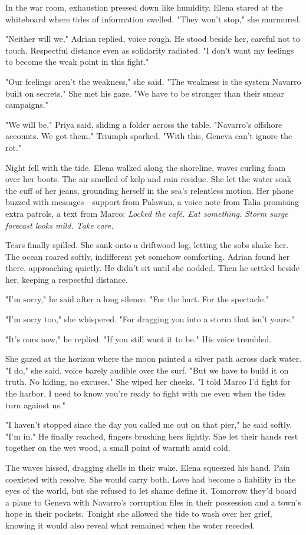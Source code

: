 In the war room, exhaustion pressed down like humidity. Elena stared at the whiteboard where tides of information swelled. "They won't stop," she murmured.

"Neither will we," Adrian replied, voice rough. He stood beside her, careful not to touch. Respectful distance even as solidarity radiated. "I don't want my feelings to become the weak point in this fight."

"Our feelings aren't the weakness," she said. "The weakness is the system Navarro built on secrets." She met his gaze. "We have to be stronger than their smear campaigns."

"We will be," Priya said, sliding a folder across the table. "Navarro's offshore accounts. We got them." Triumph sparked. "With this, Geneva can't ignore the rot."

Night fell with the tide. Elena walked along the shoreline, waves curling foam over her boots. The air smelled of kelp and rain residue. She let the water soak the cuff of her jeans, grounding herself in the sea's relentless motion. Her phone buzzed with messages—support from Palawan, a voice note from Talia promising extra patrols, a text from Marco: \textit{Locked the café. Eat something. Storm surge forecast looks mild. Take care.}

Tears finally spilled. She sank onto a driftwood log, letting the sobs shake her. The ocean roared softly, indifferent yet somehow comforting. Adrian found her there, approaching quietly. He didn't sit until she nodded. Then he settled beside her, keeping a respectful distance.

"I'm sorry," he said after a long silence. "For the hurt. For the spectacle."

"I'm sorry too," she whispered. "For dragging you into a storm that isn't yours."

"It's ours now," he replied. "If you still want it to be." His voice trembled.

She gazed at the horizon where the moon painted a silver path across dark water. "I do," she said, voice barely audible over the surf. "But we have to build it on truth. No hiding, no excuses." She wiped her cheeks. "I told Marco I'd fight for the harbor. I need to know you're ready to fight with me even when the tides turn against us."

"I haven't stopped since the day you called me out on that pier," he said softly. "I'm in." He finally reached, fingers brushing hers lightly. She let their hands rest together on the wet wood, a small point of warmth amid cold.

The waves hissed, dragging shells in their wake. Elena squeezed his hand. Pain coexisted with resolve. She would carry both. Love had become a liability in the eyes of the world, but she refused to let shame define it. Tomorrow they'd board a plane to Geneva with Navarro's corruption files in their possession and a town's hope in their pockets. Tonight she allowed the tide to wash over her grief, knowing it would also reveal what remained when the water receded.

